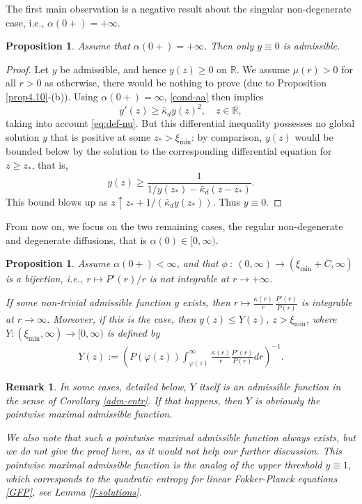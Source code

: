 \documentclass[reqno]{amsart}
\newtheorem{remark}[lemma]{Remark}
\newtheorem{prop}[lemma]{Proposition}
\newcommand{\R}{\mathbb{R}}
\begin{document}
%
The first main observation is a negative result about the singular non-degenerate case, i.e., $\alpha(0+)=+\infty$.
%
\begin{prop}
  \label{cor:admin1}
    Assume that $\alpha(0+)=+\infty$. Then only $y\equiv0$ is admissible. 
\end{prop}
%
\begin{proof}
    Let $y$ be admissible, and hence $y(z)\ge0$ on $\R$. We assume $\mu(r)>0$ for all $r>0$ as otherwise, there would be nothing to prove (due to Proposition \ref{prop4.10}-(b)). Using $\alpha(0+)=\infty$, \eqref{cond-aa} then implies
    \[ 
    y'(z)\ge\bar \kappa_d y(z)^2,\quad z\in\R, 
    \]
    taking into account \eqref{eq:def-nu}. 
    But this differential inequality possesses no global solution $y$ that is positive at some $z_*>\xi_{\min}$: by comparison, $y(z)$ would be bounded below by the solution to the corresponding differential equation for $z\ge z_*$, that is,
    \[ y(z) \ge \frac1{1/y(z_*)-\bar \kappa_d(z-z_*)}.\] 
    This bound blows up as $z\uparrow z_*+1/(\bar \kappa_d y(z_*))$. Thus $y\equiv0$.
\end{proof}
%
From now on, we focus on the two remaining cases, the regular non-degenerate and degenerate diffusions, that is $\alpha(0)\in[0,\infty)$.
%
\begin{prop}
  \label{prp:Pintegrable}
  Assume $\alpha(0+)<\infty$, and that $\phi\: :\: (0,\infty)\to(\xi_{\min}+\bar C,\infty)$ is a bijection, i.e., $r\mapsto P'(r)/r$ is not integrable at $r\to+\infty$. 
  
  If some non-trivial admissible function $y$ exists, then $r\mapsto \frac{\kappa(r)}{r}\,\frac{P'(r)}{P(r)}$ is integrable at $r\to\infty$. Moreover, if this is the case, then $y(z)\le Y(z)$, $z>\xi_{\min}$, where $Y:(\xi_{\min},\infty)\to[0,\infty)$ is defined by
    \begin{align}
    \label{eq:hatYdef}
        Y(z)
        := \left(P(\varphi(z))\int_{\varphi(z)}^\infty\frac{\kappa(r)}{r}\frac{P'(r)}{P(r)}dr \right)^{-1}.
    \end{align}
\end{prop}
%
\begin{remark}
    In some cases, detailed below, $Y$ itself is an admissible function in the sense of Corollary \ref{adm-entr}. If that happens, then $Y$ is obviously the pointwise maximal admissible function. 

    We also note that such a  pointwise maximal admissible function always exists, but we do not give the proof here, as it would not help our further discussion. 
    This pointwise maximal admissible function is the analog of the upper threshold $y\equiv1$, which corresponds to the quadratic entropy for linear Fokker-Planck equations \eqref{GFP}, see Lemma \ref{f-solutions}.
\end{remark}
\end{document}
